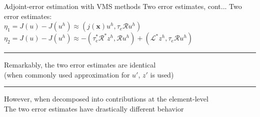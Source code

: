 \documentclass[fleqn]{beamer}
\newcommand{\bs}[1]{\boldsymbol{#1}}
\begin{document}

\begin{frame}{Adjoint-error estimation with VMS methods}
{Two error estimates, cont...}
Two error estimates: \\ [4pt]
$\eta_1 = J(u) - J(u^h) \approx (j(\bs{x}) u^h, \tau_e \mathcal{R} u^h)$ \\ [4pt]
$\eta_2 = J(u) - J(u^h) \approx -(\tau_e^* \mathcal{R}^* z^h, \mathcal{R} u^h) + 
(\mathcal{L}^* z^h, \tau_e \mathcal{R} u^h)$ \\ [8pt]
\hrule
\vspace{1em}
Remarkably, the two error estimates are identical \\
(when commonly used approximation for $u'$, $z'$ is used) \\ [8pt]
\hrule
\vspace{1em}
However, when decomposed into contributions at the element-level \\
The two error estimates have drastically different behavior
\end{frame}

\end{document}

